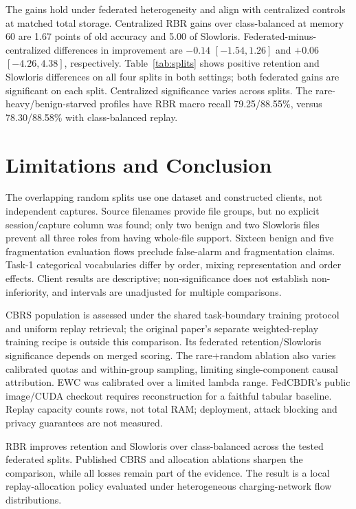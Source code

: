 \documentclass[journal,10pt]{IEEEtran}
\begin{document}
The gains hold under federated heterogeneity and align with centralized controls at matched total storage. Centralized RBR gains over class-balanced at memory 60 are 1.67 points of old accuracy and 5.00 of Slowloris. Federated-minus-centralized differences in improvement are $-0.14$ $[-1.54,1.26]$ and $+0.06$ $[-4.26,4.38]$, respectively. Table~\ref{tab:splits} shows positive retention and Slowloris differences on all four splits in both settings; both federated gains are significant on each split. Centralized significance varies across splits. The rare-heavy/benign-starved profiles have RBR macro recall 79.25/88.55\%, versus 78.30/88.58\% with class-balanced replay.


\section{Limitations and Conclusion}
The overlapping random splits use one dataset and constructed clients, not independent captures. Source filenames provide file groups, but no explicit session/capture column was found; only two benign and two Slowloris files prevent all three roles from having whole-file support. Sixteen benign and five fragmentation evaluation flows preclude false-alarm and fragmentation claims. Task-1 categorical vocabularies differ by order, mixing representation and order effects. Client results are descriptive; non-significance does not establish non-inferiority, and intervals are unadjusted for multiple comparisons.

CBRS population is assessed under the shared task-boundary training protocol and uniform replay retrieval; the original paper's separate weighted-replay training recipe is outside this comparison. Its federated retention/Slowloris significance depends on merged scoring. The rare+random ablation also varies calibrated quotas and within-group sampling, limiting single-component causal attribution. EWC was calibrated over a limited lambda range. FedCBDR's public image/CUDA checkout requires reconstruction for a faithful tabular baseline. Replay capacity counts rows, not total RAM; deployment, attack blocking and privacy guarantees are not measured.

RBR improves retention and Slowloris over class-balanced across the tested federated splits. Published CBRS and allocation ablations sharpen the comparison, while all losses remain part of the evidence. The result is a local replay-allocation policy evaluated under heterogeneous charging-network flow distributions.
\end{document}

